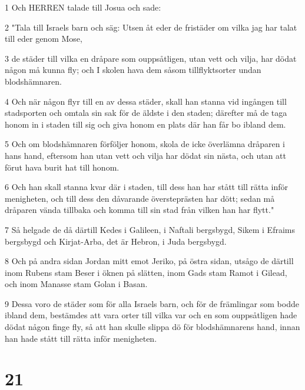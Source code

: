 \par 1 Och HERREN talade till Josua och sade:
\par 2 "Tala till Israels barn och säg: Utsen åt eder de fristäder om vilka jag har talat till eder genom Mose,
\par 3 de städer till vilka en dråpare som ouppsåtligen, utan vett och vilja, har dödat någon må kunna fly; och I skolen hava dem såsom tillflyktsorter undan blodshämnaren.
\par 4 Och när någon flyr till en av dessa städer, skall han stanna vid ingången till stadsporten och omtala sin sak för de äldste i den staden; därefter må de taga honom in i staden till sig och giva honom en plats där han får bo ibland dem.
\par 5 Och om blodshämnaren förföljer honom, skola de icke överlämna dråparen i hans hand, eftersom han utan vett och vilja har dödat sin nästa, och utan att förut hava burit hat till honom.
\par 6 Och han skall stanna kvar där i staden, till dess han har stått till rätta inför menigheten, och till dess den dåvarande översteprästen har dött; sedan må dråparen vända tillbaka och komma till sin stad från vilken han har flytt."
\par 7 Så helgade de då därtill Kedes i Galileen, i Naftali bergsbygd, Sikem i Efraims bergsbygd och Kirjat-Arba, det är Hebron, i Juda bergsbygd.
\par 8 Och på andra sidan Jordan mitt emot Jeriko, på östra sidan, utsågo de därtill inom Rubens stam Beser i öknen på slätten, inom Gads stam Ramot i Gilead, och inom Manasse stam Golan i Basan.
\par 9 Dessa voro de städer som för alla Israels barn, och för de främlingar som bodde ibland dem, bestämdes att vara orter till vilka var och en som ouppsåtligen hade dödat någon finge fly, så att han skulle slippa dö för blodshämnarens hand, innan han hade stått till rätta inför menigheten.

\chapter{21}

